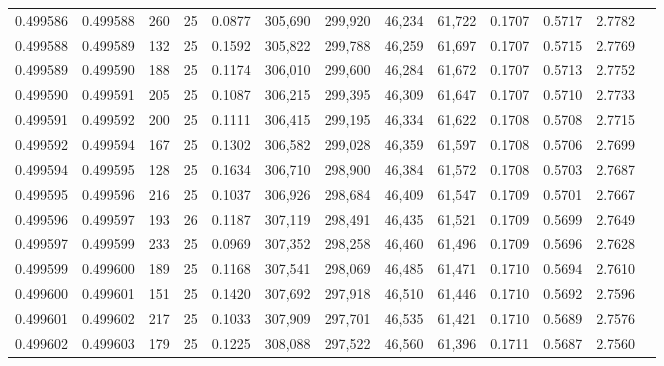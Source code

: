 \begin{tabular}{rrrrrrrrrrrrr}
0.499586 & 0.499588 & 260 &  25 &                                     0.0877 & 305,690 & 299,920 &  46,234 &  61,722 & 0.1707 & 0.5717 & 2.7782 \\
0.499588 & 0.499589 & 132 &  25 &                                     0.1592 & 305,822 & 299,788 &  46,259 &  61,697 & 0.1707 & 0.5715 & 2.7769 \\
0.499589 & 0.499590 & 188 &  25 &                                     0.1174 & 306,010 & 299,600 &  46,284 &  61,672 & 0.1707 & 0.5713 & 2.7752 \\
0.499590 & 0.499591 & 205 &  25 &                                     0.1087 & 306,215 & 299,395 &  46,309 &  61,647 & 0.1707 & 0.5710 & 2.7733 \\
0.499591 & 0.499592 & 200 &  25 &                                     0.1111 & 306,415 & 299,195 &  46,334 &  61,622 & 0.1708 & 0.5708 & 2.7715 \\
0.499592 & 0.499594 & 167 &  25 &                                     0.1302 & 306,582 & 299,028 &  46,359 &  61,597 & 0.1708 & 0.5706 & 2.7699 \\
0.499594 & 0.499595 & 128 &  25 &                                     0.1634 & 306,710 & 298,900 &  46,384 &  61,572 & 0.1708 & 0.5703 & 2.7687 \\
0.499595 & 0.499596 & 216 &  25 &                                     0.1037 & 306,926 & 298,684 &  46,409 &  61,547 & 0.1709 & 0.5701 & 2.7667 \\
0.499596 & 0.499597 & 193 &  26 &                                     0.1187 & 307,119 & 298,491 &  46,435 &  61,521 & 0.1709 & 0.5699 & 2.7649 \\
0.499597 & 0.499599 & 233 &  25 &                                     0.0969 & 307,352 & 298,258 &  46,460 &  61,496 & 0.1709 & 0.5696 & 2.7628 \\
0.499599 & 0.499600 & 189 &  25 &                                     0.1168 & 307,541 & 298,069 &  46,485 &  61,471 & 0.1710 & 0.5694 & 2.7610 \\
0.499600 & 0.499601 & 151 &  25 &                                     0.1420 & 307,692 & 297,918 &  46,510 &  61,446 & 0.1710 & 0.5692 & 2.7596 \\
0.499601 & 0.499602 & 217 &  25 &                                     0.1033 & 307,909 & 297,701 &  46,535 &  61,421 & 0.1710 & 0.5689 & 2.7576 \\
0.499602 & 0.499603 & 179 &  25 &                                     0.1225 & 308,088 & 297,522 &  46,560 &  61,396 & 0.1711 & 0.5687 & 2.7560 \\

\end{tabular}
